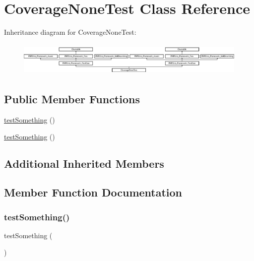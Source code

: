 \hypertarget{class_coverage_none_test}{}\section{Coverage\+None\+Test Class Reference}
\label{class_coverage_none_test}
Inheritance diagram for Coverage\+None\+Test\+:\begin{figure}[H]
\begin{center}
\leavevmode
\includegraphics[height=1.651917cm]{class_coverage_none_test}
\end{center}
\end{figure}
\subsection*{Public Member Functions}
\begin{DoxyCompactItemize}
\item 
\mbox{\hyperlink{class_coverage_none_test_a0fc4e17369bc9607ebdd850d9eda8167}{test\+Something}} ()
\item 
\mbox{\hyperlink{class_coverage_none_test_a0fc4e17369bc9607ebdd850d9eda8167}{test\+Something}} ()
\end{DoxyCompactItemize}
\subsection*{Additional Inherited Members}


\subsection{Member Function Documentation}
\mbox{\label{class_coverage_none_test_a0fc4e17369bc9607ebdd850d9eda8167}} 
\subsubsection{\texorpdfstring{test\+Something()}{testSomething()}\hspace{0.1cm}{\footnotesize\ttfamily [1/2]}}
{\footnotesize\ttfamily test\+Something (\begin{DoxyParamCaption}{ }\end{DoxyParamCaption})}

